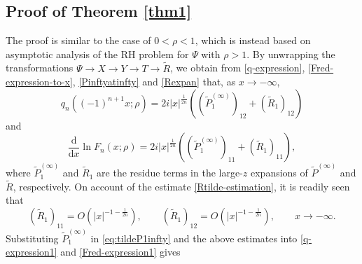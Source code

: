 \documentclass[11pt,a4paper]{article}
\numberwithin{equation}{section}
\begin{document}
\subsection{Proof of Theorem \ref{thm1} }\label{proof1}
The proof is similar to the case of $0<\rho <1$, which is instead based on asymptotic analysis of the RH problem for $\Psi$ with $\rho>1$.  By unwrapping the transformations $\Psi\to{X}\to{Y}\to{T}\to\widetilde{R}$, we obtain from \eqref{q-expression}, \eqref{Fred-expression-to-x}, \eqref{Pinftyatinfty} and \eqref{Rexpan} that, as $x\to-\infty$,
\begin{equation}\label{q-expression1}
q_n\left((-1)^{n+1}x;\rho\right)=2i|x|^{\frac{1}{2n}}
\left((\widetilde{P}^{(\infty)}_1)_{12}+(\widetilde{R}_1)_{12}\right)
\end{equation}
and
\begin{equation}\label{Fred-expression1}
\frac{\mathrm{d}}{\mathrm{d}x}\ln F_n(x;\rho)=2i|x|^{\frac{1}{2n}}
\left((\widetilde{P}^{(\infty)}_1)_{11}+(\widetilde{R}_1)_{11}\right),
\end{equation}
where $\widetilde{P}^{(\infty)}_1$ and $\widetilde{R}_1$ are the residue terms in the large-$z$ expansions of $\widetilde{P}^{(\infty)}$ and $\widetilde{R}$, respectively.
On account of the estimate \eqref{Rtilde-estimation}, it is readily seen that
\begin{equation}\label{R111asymp}
(\widetilde{R}_1)_{11}=O\left(|x|^{-1-\frac{1}{2n}}\right),\qquad (\widetilde{R}_1)_{12}=O\left(|x|^{-1-\frac{1}{2n}}\right), \qquad x\to-\infty.
\end{equation}
%
Substituting $\widetilde{P}^{(\infty)}_1$ in \eqref{eq:tildeP1infty} and the above estimates into \eqref{q-expression1} and \eqref{Fred-expression1} gives
\end{document}
